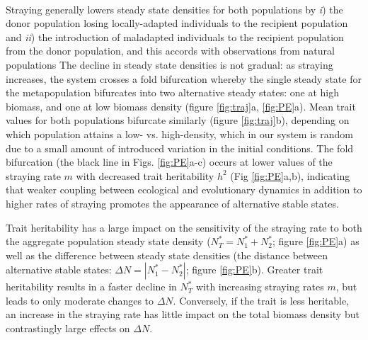 \documentclass[twocolumn,preprintnumbers,amsmath,amssymb,superscriptaddress]{revtex4}
\begin{document}

 \\
\noindent Straying generally lowers steady state densities for both populations by \emph{i}) the donor population losing locally-adapted individuals to the recipient population and \emph{ii}) the introduction of maladapted individuals to the recipient population from the donor population, and this accords with observations from natural populations \cite{Bett:2017ha} %
The decline in steady state densities is not gradual: as straying increases, the system crosses a fold bifurcation whereby the single steady state for the metapopulation bifurcates into two alternative steady states: one at high biomass, and one at low biomass density (figure \ref{fig:traj}a, \ref{fig:PE}a).
Mean trait values for both populations bifurcate similarly (figure \ref{fig:traj}b), depending on which population attains a low- vs. high-density, which in our system is random due to a small amount of introduced variation in the initial conditions.
The fold bifurcation (the black line in Figs. \ref{fig:PE}a-c) occurs at lower values of the straying rate $m$ with decreased trait heritability $h^2$ (Fig \ref{fig:PE}a,b), indicating that weaker coupling between ecological and evolutionary dynamics in addition to higher rates of straying promotes the appearance of alternative stable states.

Trait heritability has a large impact on the sensitivity of the straying rate to both the aggregate population steady state density ($N^*_T=N^*_1+N^*_2$; figure \ref{fig:PE}a) as well as the difference between steady state densities (the distance between alternative stable states: $\Delta N=|N^*_1-N^*_2|$; figure \ref{fig:PE}b).
Greater trait heritability results in a faster decline in $N_T^*$ with increasing straying rates $m$, but leads to only moderate changes to $\Delta N$.
Conversely, if the trait is less heritable, an increase in the straying rate has little impact on the total biomass density but contrastingly large effects on $\Delta N$.




\end{document}
